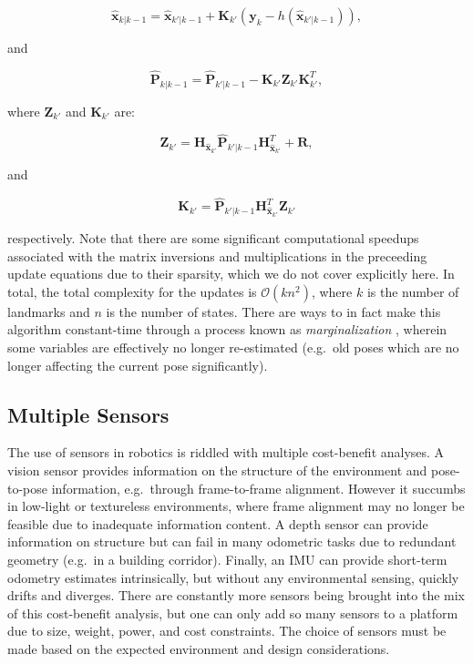 \begin{equation}
    \hat{\boldsymbol{x}}_{k|k-1}= \hat{\boldsymbol{x}}_{k'|k-1} + \boldsymbol{K}_{k'}(\boldsymbol{y}_{k} - h(\hat{\boldsymbol{x}}_{k'|k-1})),
\end{equation}

\noindent and

\begin{equation}
    \hat{\boldsymbol{P}}_{k|k-1}= \hat{\boldsymbol{P}}_{k'|k-1} - \boldsymbol{K}_{k'} \boldsymbol{Z}_{k'} \boldsymbol{K}_{k'}^T,
\end{equation}

\noindent where $\boldsymbol{Z}_{k'}$ and $\boldsymbol{K}_{k'}$ are:

\begin{equation}
    \boldsymbol{Z}_{k'} = \boldsymbol{H}_{\hat{\boldsymbol{x}}_{k'}} \hat{\boldsymbol{P}}_{k'|k-1} \boldsymbol{H}_{\hat{\boldsymbol{x}}_{k'}}^T + \boldsymbol{R},
\end{equation}

\noindent and

\begin{equation}
    \boldsymbol{K}_{k'} = \hat{\boldsymbol{P}}_{k'|k-1} \boldsymbol{H}_{\hat{\boldsymbol{x}}_{k'}}^T \boldsymbol{Z}_{k'}
\end{equation}

\noindent respectively. Note that there are some significant computational speedups associated with the matrix inversions and multiplications in the preceeding update equations due to their sparsity, which we do not cover explicitly here. In total, the total complexity for the updates is $\mathcal{O}(kn^2)$, where $k$ is the number of landmarks and $n$ is the number of states. There are ways to in fact make this algorithm constant-time through a process known as \emph{marginalization} \cite{sibley2010sliding}, wherein some variables are effectively no longer re-estimated (e.g.\ old poses which are no longer affecting the current pose significantly).


\subsection{Multiple Sensors}
The use of sensors in robotics is riddled with multiple cost-benefit analyses. A vision sensor provides information on the structure of the environment and pose-to-pose information, e.g.\ through frame-to-frame alignment. However it succumbs in low-light or textureless environments, where frame alignment may no longer be feasible due to inadequate information content. A depth sensor can provide information on structure but can fail in many odometric tasks due to redundant geometry (e.g.\ in a building corridor). Finally, an IMU can provide short-term odometry estimates intrinsically, but without any environmental sensing, quickly drifts and diverges. There are constantly more sensors being brought into the mix of this cost-benefit analysis, but one can only add so many sensors to a platform due to size, weight, power, and cost constraints. The choice of sensors must be made based on the expected environment and design considerations.

